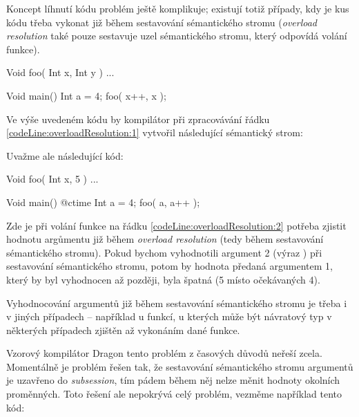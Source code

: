 
Koncept líhnutí kódu problém ještě komplikuje; existují totiž případy, kdy je kus kódu třeba vykonat již během sestavování sémantického stromu (\textit{overload resolution} také pouze sestavuje uzel sémantického stromu, který odpovídá volání funkce).

\begin{code}[\label{code:overloadResolution:1}]
	Void foo( Int x, Int y ) { ... }
	
	Void main() {
		Int a = 4;
		foo( x++, x );$\label{codeLine:overloadResolution:1}$
	}
\end{code}

Ve výše uvedeném kódu by kompilátor při zpracovávání řádku \ref{codeLine:overloadResolution:1} vytvořil následující sémantický strom:


Uvažme ale následující kód: \nopagebreak

\begin{code}
Void foo( Int x, 5 ) { ... }

Void main() {
	@ctime {
		Int a = 4;
		foo( a, a++ );$\label{codeLine:overloadResolution:2}$
	}
}
\end{code}

Zde je při volání funkce  na řádku \ref{codeLine:overloadResolution:2} potřeba zjistit hodnotu argůmentu již během \textit{overload resolution} (tedy během sestavování sémantického stromu). Pokud bychom vyhodnotili argument 2 (výraz ) při sestavování sémantického stromu, potom by hodnota předaná argumentem 1, který by byl vyhodnocen až později, byla špatná (5 místo očekávaných 4).

Vyhodnocování argumentů již během sestavování sémantického stromu je třeba i v jiných případech -- například u \ctime funkcí, u kterých může být návratový typ v některých případech zjištěn až vykonáním dané funkce.

Vzorový kompilátor Dragon tento problém z časových důvodů neřeší zcela. Momentálně je problém řešen tak, že sestavování sémantického stromu argumentů je uzavřeno do \textit{subsession}, tím pádem během něj nelze měnit hodnoty okolních \ctime proměnných. Toto řešení ale nepokrývá celý problém, vezměme například tento kód:

